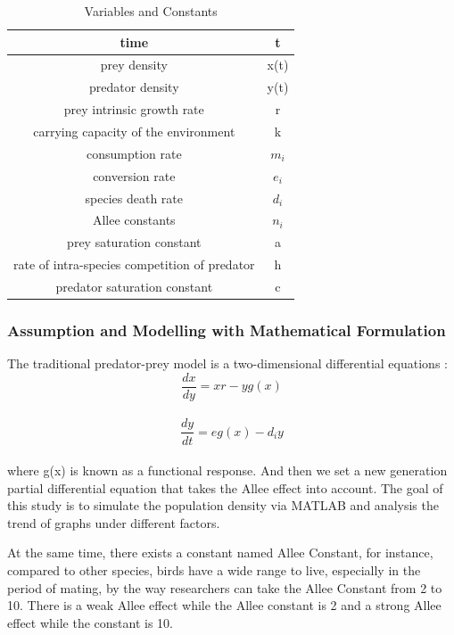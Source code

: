\documentclass[12pt]{article}
\begin{document}
\vspace{12pt}
\begin{table}[htbp]
    \centering
    \begin{tabular}{|c|c|}
    \hline
time&t\\
\hline
prey density&x(t)\\
\hline
predator density&y(t)\\
\hline
prey intrinsic growth rate&r\\
\hline
carrying capacity of the environment&k\\
\hline
consumption rate&$m_i$\\
\hline
conversion rate&$e_i$\\
\hline
species death rate&$d_i$\\
\hline
Allee constants&$n_i$\\
\hline
prey saturation constant&a\\
\hline
rate of intra-species competition of
predator&h\\
\hline
predator saturation constant&c\\
\hline
\end{tabular}
\caption{Variables and Constants}
\label{tab:my_label}
\end{table}
\vspace{24pt}

\subsubsection{Assumption and Modelling with Mathematical Formulation}
\noindent The traditional predator-prey model is a two-dimensional differential equations :
\vspace{12pt}
$$\frac{dx}{dy}=xr-yg(x)$$\\
$$\frac{dy}{dt}=eg(x)-d_iy$$\\

\noindent where g(x) is known as a functional response. And then we set a new generation partial differential equation that takes the Allee effect into account. The goal of this study is to simulate the population density via MATLAB and analysis the trend of graphs under different factors.

\vspace{24pt}

\noindent At the same time, there exists a constant named Allee Constant, for instance, compared to other species, birds have a wide range to live, especially in the period of mating, by the way researchers can take the Allee Constant from 2 to 10. There is a weak Allee effect while the Allee constant is 2 and a strong Allee effect while the constant is 10.
\vspace{24pt}
\end{document}
